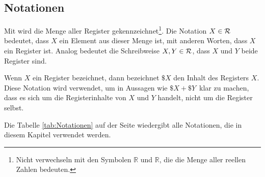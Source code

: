 \subsection{Notationen}


Mit \Reg\index{\Reg} wird die Menge aller Register
gekennzeichnet\footnote{Nicht verwechseln mit den Symbolen $\mathds{R}$ und
$\mathbb{R}$, die die Menge aller reellen Zahlen bedeuten.}.
Die Notation $X \in \mathcal{R}$ bedeutet, dass $X$ ein Element aus dieser Menge ist,
mit anderen Worten, dass $X$ ein Register ist. Analog bedeutet die
Schreibweise $X,Y \in \mathcal{R}$, dass $X$ und $Y$ beide Register sind.


Wenn $X$ ein Register bezeichnet, dann bezeichnet $\$X$ den Inhalt des
Registers $X$. Diese Notation wird verwendet, um in Aussagen wie 
\glqq $\$X + \$Y$\grqq\ klar zu machen, dass es sich um die Registerinhalte von
$X$ und $Y$ handelt, nicht um die Register selbst.

Die Tabelle \ref{tab:Notationen} auf der Seite \pageref{tab:Notationen}
wiedergibt alle Notationen, die in diesem Kapitel verwendet werden.

